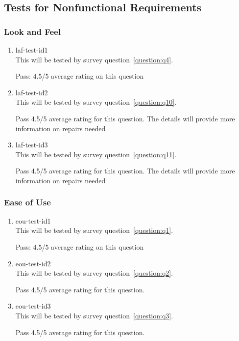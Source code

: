 \documentclass[12pt, titlepage]{article}
\begin{document}
\subsection{Tests for Nonfunctional Requirements}

\subsubsection{Look and Feel} \label{LookAndFeel}

\begin{enumerate}

\item{laf-test-id1\\}
This will be tested by survey question~\ref{question:q4}.

Pass: 4.5/5 average rating on this question
\item{laf-test-id2\\}
This will be tested by survey question~\ref{question:q10}.

Pass 4.5/5 average rating for this question. The details will provide more information on repairs needed
\item{laf-test-id3\\}
This will be tested by survey question~\ref{question:q11}.

Pass 4.5/5 average rating for this question. The details will provide more information on repairs needed
\end{enumerate}

\subsubsection{Ease of Use}

\begin{enumerate}

\item{eou-test-id1\\}
This will be tested by survey question~\ref{question:q1}.

Pass: 4.5/5 average rating on this question
\item{eou-test-id2\\}
This will be tested by survey question~\ref{question:q2}.

Pass 4.5/5 average rating for this question.
\item{eou-test-id3\\}
This will be tested by survey question~\ref{question:q3}.

Pass 4.5/5 average rating for this question.
\end{enumerate}
\end{document}
